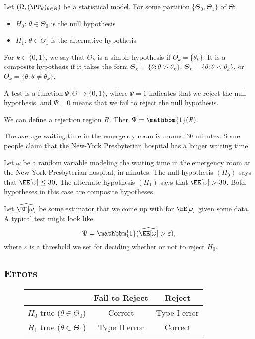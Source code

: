Let $(\Omega, (\PP_{\theta})_{\theta\in \Theta})$ be a statistical model. For some partition $\{\Theta_0, \Theta_1\}$ of $\Theta$:
\begin{itemize}
    \item $H_0$: $\theta \in \Theta_0$ is the \ac{null hypothesis}
    \item $H_1$: $\theta \in \Theta_1$ is the \ac{alternative hypothesis}
\end{itemize}
For $k\in \{0,1\}$, we say that $\Theta_k$ is a \ac{simple hypothesis} if $\Theta_k = \{\theta_k\}$. It is a \ac{composite hypothesis} if it takes the form $\Theta_k = \{\theta : \theta > \theta_k\}$, $\Theta_k = \{\theta : \theta < \theta_k\}$, or $\Theta_k = \{\theta : \theta \neq \theta_k\}$. 

\begin{definition}

A \ac{test} is a function $\Psi : \Theta \rightarrow \{0,1\}$, where $\Psi = 1$ indicates that we reject the null hypothesis, and $\Psi=0$ means that we fail to reject the null hypothesis. 

We can define a rejection region $R$. Then $\Psi = \mathbbm{1}(R)$.
\end{definition}

\begin{example}
\exlabel

The average waiting time in the emergency room is around $30$ minutes. Some people claim that the New-York Presbyterian hospital has a longer waiting time. 
\end{example}

Let $\omega$ be a random variable modeling the waiting time in the emergency room at the New-York Presbyterian hospital, in minutes. The null hypothesis $(H_0)$ says that $\EE[\omega]\leq 30$. The alternate hypothesis $(H_1)$ says that $\EE[\omega] > 30$. Both hypotheses in this case are composite hypotheses.

Let $\widehat{\EE[\omega]}$ be some estimator that we come up with for $\EE[\omega]$ given some data. A typical test might look like 
\[\Psi = \mathbbm{1}(\widehat{\EE[\omega]} > \varepsilon),\]
where $\varepsilon$ is a threshold we set for deciding whether or not to reject $H_0$.

\subsection{Errors}

\begin{figure}[H]
\centering
\begin{tabular}{c|c|c|}
    & Fail to Reject & Reject \\
\hline
    $H_0$ true ($\theta\in \Theta_0$) & Correct & Type I error \\
\hline
    $H_1$ true ($\theta\in \Theta_1$) & Type II error & Correct \\
\hline
\end{tabular}
\end{figure}

